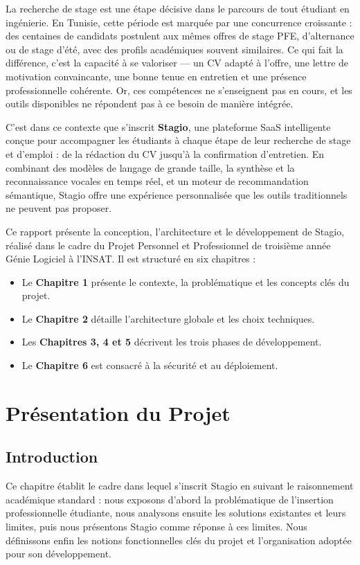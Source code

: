 ﻿\documentclass[12pt,a4paper]{report}
\begin{document}
La recherche de stage est une étape décisive dans le parcours de tout étudiant en ingénierie. En Tunisie, cette période est marquée par une concurrence croissante : des centaines de candidats postulent aux mêmes offres de stage PFE, d'alternance ou de stage d'été, avec des profils académiques souvent similaires. Ce qui fait la différence, c'est la capacité à se valoriser — un CV adapté à l'offre, une lettre de motivation convaincante, une bonne tenue en entretien et une présence professionnelle cohérente. Or, ces compétences ne s'enseignent pas en cours, et les outils disponibles ne répondent pas à ce besoin de manière intégrée.

C'est dans ce contexte que s'inscrit \textbf{Stagio}, une plateforme \ac{SaaS} intelligente conçue pour accompagner les étudiants à chaque étape de leur recherche de stage et d'emploi : de la rédaction du CV jusqu'à la confirmation d'entretien. En combinant des modèles de langage de grande taille, la synthèse et la reconnaissance vocales en temps réel, et un moteur de recommandation sémantique, Stagio offre une expérience personnalisée que les outils traditionnels ne peuvent pas proposer.

Ce rapport présente la conception, l'architecture et le développement de Stagio, réalisé dans le cadre du Projet Personnel et Professionnel de troisième année Génie Logiciel à l'INSAT. Il est structuré en six chapitres :
\begin{itemize}
  \item Le \textbf{Chapitre 1} présente le contexte, la problématique et les concepts clés du projet.
  \item Le \textbf{Chapitre 2} détaille l'architecture globale et les choix techniques.
  \item Les \textbf{Chapitres 3, 4 et 5} décrivent les trois phases de développement.
  \item Le \textbf{Chapitre 6} est consacré à la sécurité et au déploiement.
\end{itemize}

\chapter{Présentation du Projet}

\section*{Introduction}
Ce chapitre établit le cadre dans lequel s'inscrit Stagio en suivant le raisonnement académique standard : nous exposons d'abord la problématique de l'insertion professionnelle étudiante, nous analysons ensuite les solutions existantes et leurs limites, puis nous présentons Stagio comme réponse à ces limites. Nous définissons enfin les notions fonctionnelles clés du projet et l'organisation adoptée pour son développement.
\end{document}
